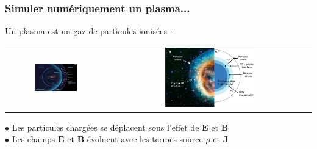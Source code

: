 \documentclass{beamer}
\begin{document}
\begin{frame}
\frametitle{Simuler numériquement un plasma...}

Un plasma est un gaz de particules ionisées :

\begin{center}
\begin{tabular}{cc}
\includegraphics[width=0.45\textwidth]{heliosphere.jpg} &
\includegraphics[width=0.45\textwidth]{41467_2018_3548_Fig4_HTML.png} \\
\end{tabular}
\end{center}

$\bullet$ Les particules chargées se déplacent sous l'effet de $\mathbf E$ et $\mathbf B$ \\
$\bullet$ Les champs $\mathbf E$ et $\mathbf B$ évoluent avec les termes source $\rho$ et $\mathbf J$ \\

\begin{center}

\end{center}

\end{frame}
\end{document}
